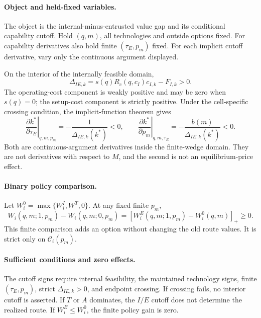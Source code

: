 \paragraph{Object and held-fixed variables.}
The object is the internal-minus-entrusted value gap and its conditional
capability cutoff. Hold \((q,m)\), all technologies and outside options fixed.
For capability derivatives also hold finite \((\tau_E,p_m)\) fixed. For each
implicit cutoff derivative, vary only the continuous argument displayed.

On the interior of the internally feasible domain,
\begin{equation}
  \Delta_{IE,k}
  =
  s(q)R_c(q,c_I)c_{I,k}-F_{I,k}>0.
  \label{eq:p15-gap-capability}
\end{equation}
The operating-cost component is weakly positive and may be zero when
\(s(q)=0\); the setup-cost component is strictly positive. Under the
cell-specific crossing condition, the implicit-function theorem gives
\begin{equation}
  \left.\frac{\partial k^*}{\partial\tau_E}\right|_{q,m,p_m}
  =
  -\frac{1}{\Delta_{IE,k}(k^*)}<0,
  \qquad
  \left.\frac{\partial k^*}{\partial p_m}\right|_{q,m,\tau_E}
  =
  -\frac{b(m)}{\Delta_{IE,k}(k^*)}<0.
  \label{eq:p15-cutoff-derivatives}
\end{equation}
Both are continuous-argument derivatives inside the finite-wedge domain.
They are not derivatives with respect to \(M\), and the second is not an
equilibrium-price effect.

\paragraph{Binary policy comparison.}
Let \(W_i^0=\max\{W_i^I,W^T,0\}\). At any fixed finite \(p_m\),
\begin{equation}
  W_i(q,m;1,p_m)-W_i(q,m;0,p_m)
  =
  [W_i^E(q,m;1,p_m)-W_i^0(q,m)]_+\geq0.
  \label{eq:p15-fixed-project-gain}
\end{equation}
This finite comparison adds an option without changing the old route values.
It is strict only on \(\mathcal C_i(p_m)\).

\paragraph{Sufficient conditions and zero effects.}
The cutoff signs require internal feasibility, the maintained technology signs,
finite \((\tau_E,p_m)\), strict \(\Delta_{IE,k}>0\), and endpoint crossing.
If crossing fails, no interior cutoff is asserted. If \(T\) or \(A\) dominates,
the \(I/E\) cutoff does not determine the realized route. If
\(W_i^E\leq W_i^0\), the finite policy gain is zero.

